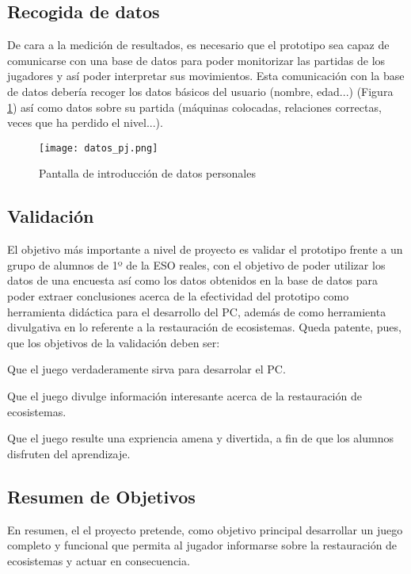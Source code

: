 \subsection{Recogida de datos}

De cara a la medición de resultados, es necesario que el prototipo sea capaz de comunicarse con una base de datos para poder monitorizar las partidas de los jugadores y así poder interpretar sus movimientos. 
Esta comunicación con la base de datos debería recoger los datos básicos del usuario (nombre, edad...) (Figura \ref{fig:datos}) así como datos sobre su partida (máquinas colocadas, relaciones correctas, veces que ha perdido el nivel...).

\begin{figure}[H]
    \centering
      \texttt{[image: datos\_pj.png]}
    \caption{Pantalla de introducción de datos personales}
    \label{fig:datos}
\end{figure}

\subsection{Validación}

El objetivo más importante a nivel de proyecto es validar el prototipo frente a un grupo de alumnos de 1º de la ESO reales, con el objetivo de poder utilizar los datos de una encuesta así como los datos obtenidos en la base de datos para poder extraer conclusiones acerca de la efectividad del prototipo como herramienta didáctica para el desarrollo del PC, además de como herramienta divulgativa en lo referente a la restauración de ecosistemas.
Queda patente, pues, que los objetivos de la validación deben ser:
\begin{compactitem}
    \item Que el juego verdaderamente sirva para desarrolar el PC.
    \item Que el juego divulge información interesante acerca de la restauración de ecosistemas.
    \item Que el juego resulte una expriencia amena y divertida, a fin de que los alumnos disfruten del aprendizaje.
\end{compactitem} 

\subsection{Resumen de Objetivos}

En resumen, el el proyecto pretende, como objetivo principal desarrollar un juego completo y funcional que permita al jugador informarse sobre la restauración de ecosistemas y actuar en consecuencia.

